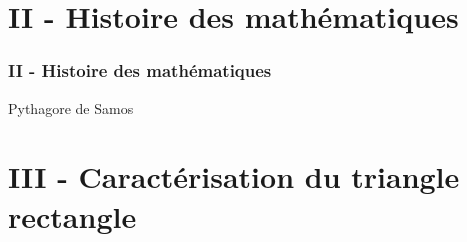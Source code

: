 \documentclass{beamer}
\begin{document}
\section{II - Histoire des mathématiques}

\begin{frame}
  \frametitle{II - Histoire des mathématiques}

  \begin{block}{Pythagore de Samos}
    \vspace{4cm}
  \end{block}
\end{frame}


\section{III - Caractérisation du triangle rectangle}
\end{document}

